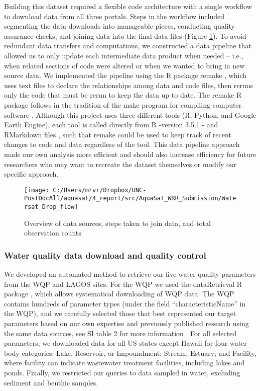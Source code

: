 \documentclass[]{agujournal2018}
\begin{document}
Building this dataset required a flexible code architecture with a
single workflow to download data from all three portals. Steps in the
workflow included segmenting the data downloads into manageable pieces,
conducting quality assurance checks, and joining data into the final
data files (Figure \ref{fig:fig1}). To avoid redundant data transfers
and computations, we constructed a data pipeline that allowed us to only
update each intermediate data product when needed -- i.e., when related
sections of code were altered or when we wanted to bring in new source
data. We implemented the pipeline using the R package remake
\citep{FitzJohn2018}, which uses text files to declare the relationships
among data and code files, then reruns only the code that must be rerun
to keep the data up to date. The remake R package follows in the
tradition of the make program for compiling computer software
\citep{Feldman1979}. Although this project uses three different tools
(R, Python, and Google Earth Engine), each tool is called directly from
R -version 3.5.1 \citep{RFoundationforStatisticalComputing2018}- and
RMarkdown files \citep{Allaire2018}, such that remake could be used to
keep track of recent changes to code and data regardless of the tool.
This data pipeline approach made our own analysis more efficient and
should also increase efficiency for future researchers who may want to
recreate the dataset themselves or modify our specific approach.

\begin{figure}[h]
\texttt{[image: C:/Users/mrvr/Dropbox/UNC-PostDocAll/aquasat/4\_report/src/AquaSat\_WRR\_Submission/Watersat\_Drop\_flow]} \caption{Overview of data sources, steps taken to join data, and total observation counts}\label{fig:fig1}
\end{figure}

\subsubsection{Water quality data download and quality control}

We developed an automated method to retrieve our five water quality
parameters from the WQP and LAGOS sites. For the WQP we used the
dataRetrieval R package \citep{Hirsch2015}, which allows systematical
downloading of WQP data. The WQP contains hundreds of parameter types
(under the field ``characteristicName'' in the WQP), and we carefully
selected those that best represented our target parameters based on our
own expertise and previously published research using the same data
sources, see SI table 2 for more information
\citep{Butman2016,Stets2012}. For all selected parameters, we downloaded
data for all US states except Hawaii for four water body categories:
Lake, Reservoir, or Impoundment; Stream; Estuary; and Facility, where
facility can indicate wastewater treatment facilities, including lakes
and ponds. Finally, we restricted our queries to data sampled in water,
excluding sediment and benthic samples.
\end{document}
